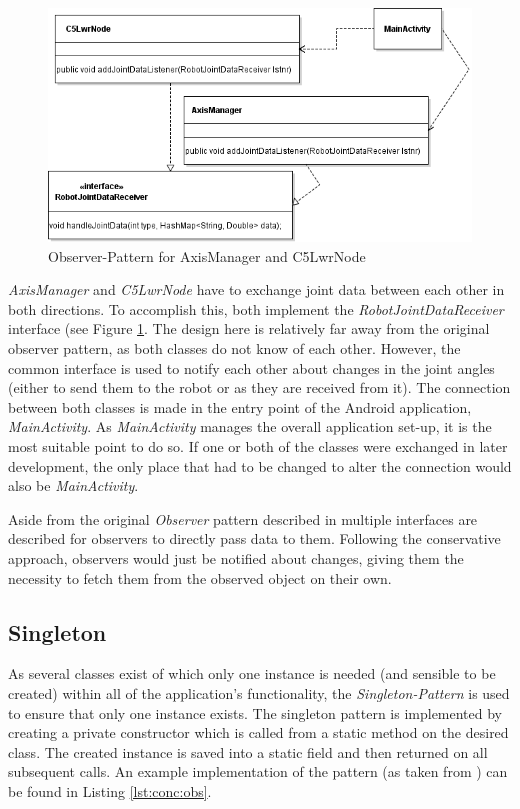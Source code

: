 \begin{figure}
	\caption{Observer-Pattern for AxisManager and C5LwrNode\label{fig:conc:obs2}}
	\includegraphics[width=\linewidth]{assets/chpt_concepts/sw/node_axismanager.png}
\end{figure}

\textit{AxisManager} and \textit{C5LwrNode} have to exchange joint data between each other in both directions. To accomplish this, both implement the \textit{RobotJointDataReceiver} interface (see Figure \ref{fig:conc:obs2}. The design here is relatively far away from the original observer pattern, as both classes do not know of each other. However, the common interface is used to notify each other about changes in the joint angles (either to send them to the robot or as they are received from it). The connection between both classes is made in the entry point of the Android application, \textit{MainActivity}. As \textit{MainActivity} manages the overall application set-up, it is the most suitable point to do so. If one or both of the classes were exchanged in later development, the only place that had to be changed to alter the connection would also be \textit{MainActivity}.

Aside from the original \textit{Observer} pattern described in \cite{Eilebrecht2013} multiple interfaces are described for observers to directly pass data to them. Following the conservative approach, observers would just be notified about changes, giving them the necessity to fetch them from the observed object on their own.

\subsection{Singleton}

As several classes exist of which only one instance is needed (and sensible to be created) within all of the application's functionality, the \textit{Singleton-Pattern} is used to ensure that only one instance exists. The singleton pattern is implemented by creating a private constructor which is called from a static method on the desired class. The created instance is saved into a static field and then returned on all subsequent calls. An example implementation of the pattern (as taken from \cite{Eilebrecht2013}) can be found in Listing \ref{lst:conc:obs}.

